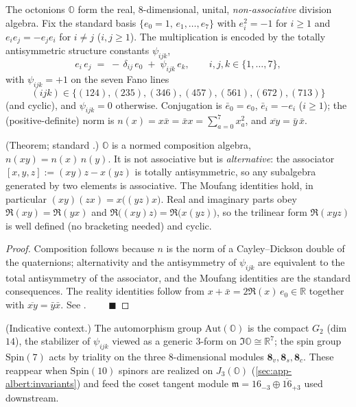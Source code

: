 \begin{definition}[Octonions]\label{def:app-albert:octonions}
The octonions $\mathbb O$ form the real, $8$-dimensional, unital,
\emph{non-associative} division algebra. Fix the standard basis
$\{e_0=1,\,e_1,\dots,e_7\}$ with $e_i^2=-1$ for $i\ge 1$ and $e_i e_j=-e_j e_i$
for $i\neq j$ ($i,j\ge 1$). The multiplication is encoded by the totally
antisymmetric structure constants $\psi_{ijk}$,
\begin{equation}\label{eq:app-albert:struct}
  e_i\, e_j \;=\; -\,\delta_{ij}\,e_0 \;+\; \psi_{ijk}\,e_k ,
  \qquad i,j,k\in\{1,\dots,7\},
\end{equation}
with $\psi_{ijk}=+1$ on the seven Fano lines
\begin{equation}\label{eq:app-albert:fano}
  (ijk)\in\bigl\{(124),(235),(346),(457),(561),(672),(713)\bigr\}
\end{equation}
(and cyclic), and $\psi_{ijk}=0$ otherwise. Conjugation is
$\bar e_0=e_0$, $\bar e_i=-e_i$ ($i\ge1$); the (positive-definite) norm is
$n(x)=x\bar x=\bar x x=\sum_{a=0}^{7}x_a^2$, and $\overline{xy}=\bar y\,\bar x$.
\end{definition}

\begin{theorem}\label{thm:app-albert:moufang}
\textup{(Theorem; standard \cite{Baez:2002,Springer:2000}.)}
$\mathbb O$ is a normed composition algebra, $n(xy)=n(x)\,n(y)$. It is not
associative but is \emph{alternative}: the associator
$[x,y,z]:=(xy)z-x(yz)$ is totally antisymmetric, so any subalgebra generated by
two elements is associative. The Moufang identities hold, in particular
$(xy)(zx)=x\bigl((yz)x\bigr)$. Real and imaginary parts obey
$\Re(xy)=\Re(yx)$ and $\Re\bigl((xy)z\bigr)=\Re\bigl(x(yz)\bigr)$, so the
trilinear form $\Re(xyz)$ is well defined (no bracketing needed) and cyclic.
\end{theorem}

\begin{proof}
Composition follows because $n$ is the norm of a Cayley--Dickson double of the
quaternions; alternativity and the antisymmetry of $\psi_{ijk}$ are equivalent to
the total antisymmetry of the associator, and the Moufang identities are the
standard consequences. The reality identities follow from
$x+\bar x=2\Re(x)\,e_0\in\mathbb R$ together with $\overline{xy}=\bar y\bar x$.
See \cite{Baez:2002,Schafer:1966}. $\qquad\blacksquare$
\end{proof}

\begin{remark}\label{rmk:app-albert:g2}
\textup{(Indicative context.)}
The automorphism group $\mathrm{Aut}(\mathbb O)$ is the compact $G_2$ (dim $14$),
the stabilizer of $\psi_{ijk}$ viewed as a generic $3$-form on $\Im\mathbb O\cong
\mathbb R^7$; the spin group $\mathrm{Spin}(7)$ acts by triality on the three
$8$-dimensional modules $\mathbf 8_v,\mathbf 8_s,\mathbf 8_c$. These reappear when
$\mathrm{Spin}(10)$ spinors are realized on $J_3(\mathbb O)$
(\autoref{sec:app-albert:invariants}) and feed the coset tangent module
$\mathfrak m=16_{-3}\oplus\overline{16}_{+3}$ used downstream.
\end{remark}

